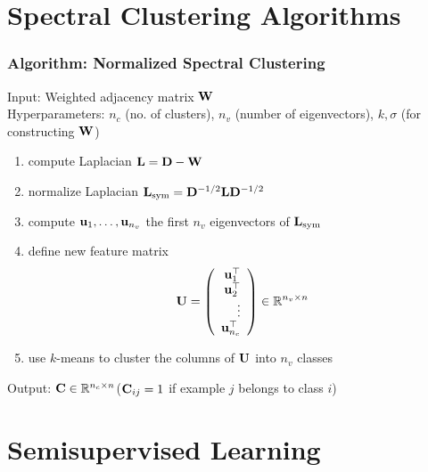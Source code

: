 \documentclass[12pt,handout]{beamer}
\begin{document}


\section{Spectral Clustering Algorithms} %
\label{sec:spectral_clustering_algorithms}
\begin{frame}
	\frametitle{Algorithm: Normalized Spectral Clustering~\cite{NgEtAl2002}}
	
	Input: Weighted adjacency matrix ${\bf W}$\\
	Hyperparameters: $n_c$ (no. of clusters), $n_v$ (number of eigenvectors), $k,\sigma$ (for constructing ${\bf W}$)
	\begin{enumerate}
		\item compute Laplacian ${\bf L} = {\bf D} - {\bf W}$
		\item normalize Laplacian ${\bf L}_{\rm sym} = {\bf D}^{-1/2} {\bf L} {\bf D}^{-1/2}$ 
		\item compute ${\bf u}_1,\ldots,{\bf u}_{n_v}$ the first $n_v$ eigenvectors of ${\bf L}_{\rm sym}$
		\item define new feature matrix 
		\begin{equation*}
			{\bf U} = \left( 
				\begin{array}{r}
					{\bf u}_1^\top\\
					{\bf u}_2^\top\\
					\vdots\\
					{\bf u}_{n_c}^\top
				\end{array}
				\right)\in \mathbb{R}^{n_v \times n}
		\end{equation*}
		\item use $k$-means to cluster the columns of ${\bf U}$ into $n_v$ classes
	\end{enumerate}
	Output: ${\bf C} \in \mathbb{R}^{n_c \times n}$(${\bf C}_{ij}=1$ if example $j$ belongs to class $i$)
\end{frame}

\section{Semisupervised Learning} %
\label{sec:semisupervised_learning}
\end{document}
